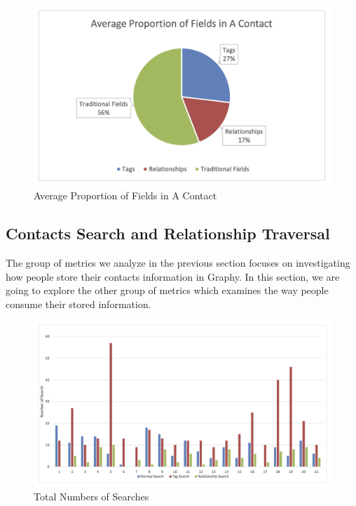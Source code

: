 \begin{figure}[!h]
\begin{centering}
\includegraphics[scale=0.7]{pics/average_contact_fields.png}
\caption{Average Proportion of Fields in A Contact}\label{fig:average_contact_fields}
\end{centering}
\end{figure}

\subsection{Contacts Search and Relationship Traversal}\label{results_search}

The group of metrics we analyze in the previous section focuses on investigating how people store their contacts information in Graphy. In this section, we are going to explore the other group of metrics which examines the way people consume their stored information.

\begin{figure}[!h]
\begin{centering}
\includegraphics[scale=0.7]{pics/search_total.png}
\caption{Total Numbers of Searches}\label{fig:search_total}
\end{centering}
\end{figure}

